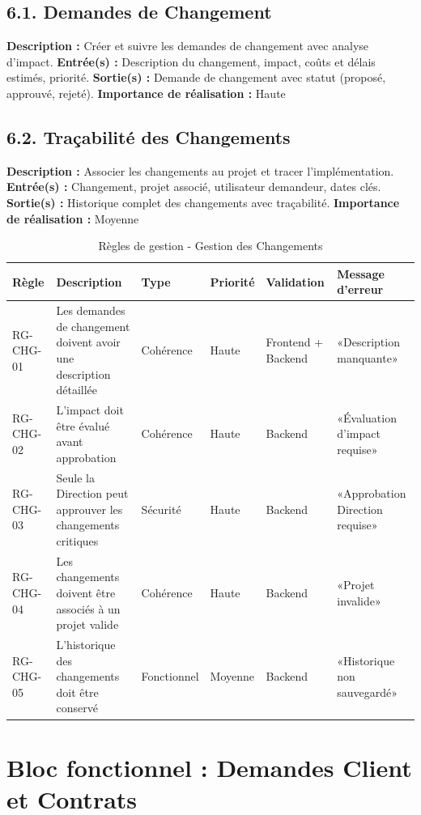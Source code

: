 \subsection{6.1. Demandes de Changement}
\textbf{Description :} Créer et suivre les demandes de changement avec analyse d'impact.
\textbf{Entrée(s) :} Description du changement, impact, coûts et délais estimés, priorité.
\textbf{Sortie(s) :} Demande de changement avec statut (proposé, approuvé, rejeté).
\textbf{Importance de réalisation :} Haute

\subsection{6.2. Traçabilité des Changements}
\textbf{Description :} Associer les changements au projet et tracer l'implémentation.
\textbf{Entrée(s) :} Changement, projet associé, utilisateur demandeur, dates clés.
\textbf{Sortie(s) :} Historique complet des changements avec traçabilité.
\textbf{Importance de réalisation :} Moyenne

\begin{table}[H]
\centering
\footnotesize
\begin{tabular}{|p{1.5cm}|p{3.5cm}|p{1.5cm}|p{1.5cm}|p{2cm}|p{2.5cm}|}
\hline
\textbf{Règle} & \textbf{Description} & \textbf{Type} & \textbf{Priorité} & \textbf{Validation} & \textbf{Message d'erreur} \\
\hline
RG-CHG-01 & Les demandes de changement doivent avoir une description détaillée & Cohérence & Haute & Frontend + Backend & «Description manquante» \\
\hline
RG-CHG-02 & L'impact doit être évalué avant approbation & Cohérence & Haute & Backend & «Évaluation d'impact requise» \\
\hline
RG-CHG-03 & Seule la Direction peut approuver les changements critiques & Sécurité & Haute & Backend & «Approbation Direction requise» \\
\hline
RG-CHG-04 & Les changements doivent être associés à un projet valide & Cohérence & Haute & Backend & «Projet invalide» \\
\hline
RG-CHG-05 & L'historique des changements doit être conservé & Fonctionnel & Moyenne & Backend & «Historique non sauvegardé» \\
\hline
\end{tabular}
\caption{Règles de gestion - Gestion des Changements}
\label{tab:rg_changements}
\end{table}

\section{Bloc fonctionnel : Demandes Client et Contrats}

